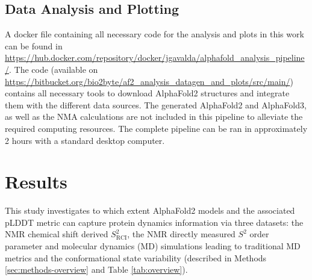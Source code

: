 

\subsection{Data Analysis and Plotting}

A docker file containing all necessary code for the analysis and plots in this work can be found in \url{https://hub.docker.com/repository/docker/jgavalda/alphafold_analysis_pipeline/}. The code (available on \url{https://bitbucket.org/bio2byte/af2_analysis_datagen_and_plots/src/main/}) contains all necessary tools to download AlphaFold2 structures and integrate them with the different data sources. 
The generated AlphaFold2 and AlphaFold3, as well as the NMA calculations are not included in this pipeline to alleviate the required computing resources. The complete pipeline can be ran in approximately 2 hours with a standard desktop computer.

\section{Results}

This study investigates to which extent AlphaFold2 models and the associated pLDDT metric can capture protein dynamics information via three datasets: the NMR chemical shift derived $S^{2}_{\text{RCI}}$, the NMR directly measured $S^{2}$ order parameter and molecular dynamics (MD) simulations leading to traditional MD metrics and the conformational state variability (described in Methods \ref{sec:methods-overview} and Table \ref{tab:overview}).

